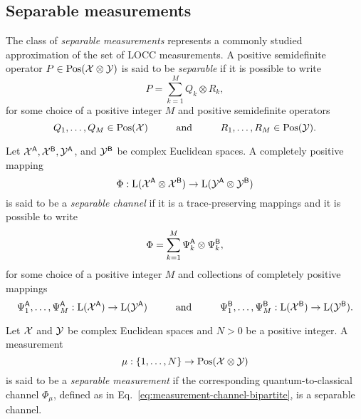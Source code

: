 \subsection{Separable measurements}

The class of \emph{separable measurements} represents a commonly studied
approximation of the set of LOCC measurements.
A positive semidefinite operator $P\in\mathrm{Pos}(\mathcal{X}\otimes\mathcal{Y})$ is said to be
\emph{separable} if it is possible to write
\begin{equation}
  P = \sum_{k = 1}^{M} Q_k \otimes R_k,
\end{equation}
for some choice of a positive integer $M$ and positive semidefinite operators
\begin{equation}
  Q_1,\ldots,Q_M \in \mathrm{Pos}(\mathcal{X})
  \hspace*{1cm}\mbox{and}\hspace*{1cm}
  R_1,\ldots,R_M\in\mathrm{Pos}(\mathcal{Y}).
\end{equation}

\begin{definition}
Let $\mathcal{X}^{\mathsf{A}}, \mathcal{X}^{\mathsf{B}}, \mathcal{Y}^{\mathsf{A}}$, and $\mathcal{Y}^{\mathsf{B}}$ be complex
Euclidean spaces.
A completely positive mapping 
\[
  \Phi:\mathrm{L}(\mathcal{X}^{\mathsf{A}}\otimes\mathcal{X}^{\mathsf{B}})\to\mathrm{L}(\mathcal{Y}^{\mathsf{A}}\otimes\mathcal{Y}^{\mathsf{B}})
\]
is said to be a 
\emph{separable channel} if it is a trace-preserving mappings and it is possible 
to write
\begin{equation}
  \Phi = \sum_{k = 1}^{M}\Psi_{k}^{\mathsf{A}}\otimes\Psi_{k}^{\mathsf{B}},
\end{equation}
for some choice of a positive integer $M$ and collections of
completely positive mappings 
\begin{equation}
  \Psi_1^{\mathsf{A}},\ldots,\Psi_{M}^{\mathsf{A}} : \mathrm{L}(\mathcal{X}^{\mathsf{A}})\to\mathrm{L}(\mathcal{Y}^{\mathsf{A}})
  \hspace*{1cm}\mbox{and}\hspace*{1cm}
  \Psi_1^{\mathsf{B}},\ldots,\Psi_{M}^{\mathsf{B}} : \mathrm{L}(\mathcal{X}^{\mathsf{B}})\to\mathrm{L}(\mathcal{Y}^{\mathsf{B}}).
\end{equation}
\end{definition}

\begin{definition}
Let $\mathcal{X}$ and $\mathcal{Y}$ be complex Euclidean spaces and $N > 0$ be a positive integer. 
A measurement
\begin{equation}
  \mu: \{1, \ldots, N \} \rightarrow \mathrm{Pos}(\mathcal{X}\otimes\mathcal{Y})
\end{equation}
is said to be a \emph{separable measurement} if the 
corresponding quantum-to-classical channel $\Phi_{\mu}$, defined as in 
Eq.~\eqref{eq:measurement-channel-bipartite}, is a separable channel.
\end{definition}

